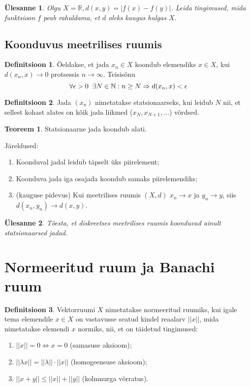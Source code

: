 \documentclass{article}[12pt]
\newcommand{\h}{\hspace{0.2cm}}
\newcommand{\R}{\mathbb{R}}
\newcommand{\N}{\mathbb{N}}
\newtheorem{yl}{Ülesanne}[section]
\theoremstyle{definition}
\newtheorem{definition}{Definitsioon}[section]
\theoremstyle{definition}
\newtheorem{theorem}{Teoreem}[section]
\theoremstyle{definition}
\begin{document}
\begin{yl}
	Olgu $X=\R, d(x,y) = |f(x)-f(y)|$. Leida tingimused, mida funktsioon $f$ peab rahuldama, et $d$ oleks kaugus hulgas $X$.	
\end{yl}

\subsection*{Koonduvus meetrilises ruumis}

\begin{definition}
	Öeldakse, et jada $x_n\in X$ koondub elemendiks $x\in X$, kui $d(x_n,x)\rightarrow 0$ protsessis $n\rightarrow \infty$.
	Teisisõnu
	\[
		\forall \epsilon > 0 \h\exists N\in \N : n\geq N\Rightarrow d(x_n,x)<\epsilon
	\]	
\end{definition}
\begin{definition}
	Jada $(x_n)$ nimetatakse statsionaarseks, kui leidub $N$ nii, et sellest kohast alates on kõik jada liikmed ($x_N,x_{N+1},\dots$) võrdsed.
\end{definition}
\begin{theorem}
	Statsionaarne jada koondub alati.
\end{theorem}

Järeldused:
\begin{enumerate}
	\item Koonduval jadal leidub täpselt üks piirelement;
	\item Koonduva jada iga osajada koondub samaks piirelemendiks;
	\item (kauguse pidevus) Kui meetrilises ruumis $(X,d)$ $x_n\rightarrow x$ ja $y_n \rightarrow y$, siis $d(x_n,y_n)\rightarrow d(x,y)$.
\end{enumerate}

\begin{yl}
	Tõesta, et diskreetses meetrilises ruumis koonduvad ainult statsionaarsed jadad.
\end{yl}

\section{Normeeritud ruum ja Banachi ruum}

\begin{definition}
	Vektorruumi $X$ nimetatakse normeeritud ruumiks, kui igale tema elemendile $x\in X$ on vastavusse seatud kindel reaalarv $||x||$, mida nimetatakse elemendi $x$ normiks, nii, et on täidetud tingimused:
	\begin{enumerate}
		\item $||x|| = 0 \Leftrightarrow x=0$ (samasuse aksioom);
		\item $||\lambda x|| = ||\lambda||\cdot ||x||$ (homogeensuse aksioom);
		\item $||x+y|| \leq ||x|| + ||y||$ (kolmnurga võrratus).
	\end{enumerate}	
\end{definition}
\end{document}
